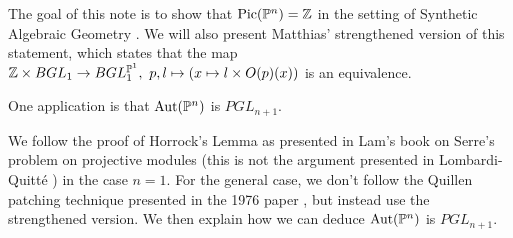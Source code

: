The goal of this note is to show that $\mathrm{Pic}(\mathbb{P}^n) = \mathbb{Z}$ in the setting of Synthetic Algebraic
Geometry \cite{draft}.
We will also present Matthias' strengthened version of this statement, which states that the
map $\mathbb{Z}\times BGL_1\rightarrow BGL_1^{\mathbb{P}^1},~p,l\mapsto (x\mapsto l\times O(p)(x))$
is an equivalence.

One application is that $\mathrm{Aut}(\mathbb{P}^n)$ is $PGL_{n+1}$.

We follow the proof of Horrock's Lemma as presented in Lam's book on Serre's problem \cite{Lam}
on projective modules (this is not the argument presented in Lombardi-Quitt\'e \cite{lombardi-quitte})
in the case $n=1$. For the general case, we don't follow the Quillen patching technique
presented in the 1976 paper \cite{Quillen}, but instead use the strengthened version.
We then explain how we can deduce $\mathrm{Aut}(\mathbb{P}^n)$ is $PGL_{n+1}$.
